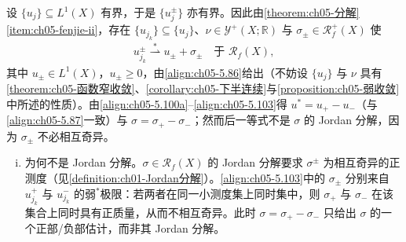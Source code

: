 \documentclass[../../main.tex]{subfiles}
\begin{document}
\begin{remark}\label{remark:ch05-5.4.5}\label{remark:ch05-biting注}
设 $\{u_j\}\subseteq L^1(X)$ 有界，于是 $\{u^\pm_j\}$ 亦有界。因此由\cref{theorem:ch05-分解}\cref{item:ch05-fenjie-ii}，存在 $\{u_{j_k}\}\subseteq\{u_j\}$、$\nu\in\mathcal{Y}^+(X;\mathbb{R})$ 与 $\sigma_\pm\in\mathscr{R}^+_f(X)$ 使
\begin{align}
u^\pm_{j_k}\stackrel{*}{\rightharpoonup}u_\pm+\sigma_\pm
\quad\text{于 }\mathscr{R}_f(X),\label{align:ch05-5.103}
\end{align}
其中 $u_\pm\in L^1(X)$，$u_\pm\geqslant0$，由\eqref{align:ch05-5.86}给出（不妨设 $\{u_j\}$ 与 $\nu$ 具有\cref{theorem:ch05-函数窄收敛}、\cref{corollary:ch05-下半连续}与\cref{proposition:ch05-弱收敛}中所述的性质）。由\eqref{align:ch05-5.100a}--\eqref{align:ch05-5.103}得 $u^*=u_+-u_-$（与\eqref{align:ch05-5.87}一致）与 $\sigma=\sigma_+-\sigma_-$；然而后一等式不是 $\sigma$ 的 Jordan 分解，因为 $\sigma_\pm$ 不必相互奇异。

\begin{enumerate}[(i)]
\item 为何不是 Jordan 分解。$\sigma\in\mathscr{R}_f(X)$ 的 Jordan 分解要求 $\sigma^\pm$ 为相互奇异的正测度（见\cref{definition:ch01-Jordan分解}）。\eqref{align:ch05-5.103}中的 $\sigma_\pm$ 分别来自 $u^+_{j_k}$ 与 $u^-_{j_k}$ 的弱$^*$极限：若两者在同一小测度集上同时集中，则 $\sigma_+$ 与 $\sigma_-$ 在该集合上同时具有正质量，从而不相互奇异。此时 $\sigma=\sigma_+-\sigma_-$ 只给出 $\sigma$ 的一个正部/负部估计，而非其 Jordan 分解。
\end{enumerate}
\end{remark}
\end{document}
